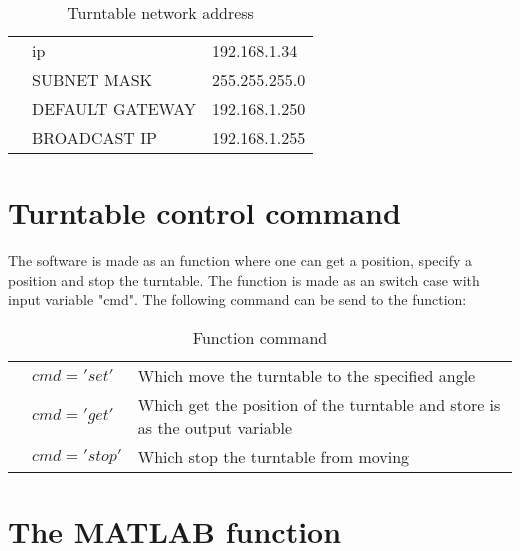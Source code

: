 \begin{table}[H]
\centering
\caption{Turntable network address}
\label{my-label}
\begin{tabular}{lll}
 & \gls{ip} & 192.168.1.34   \\
 & SUBNET MASK  & 255.255.255.0   \\
 & DEFAULT GATEWAY  & 192.168.1.250  \\
 & BROADCAST IP   &  192.168.1.255   
\end{tabular}
\end{table}



\section*{Turntable control command}
The software is made as an function where one can get a position, specify a position and stop the turntable. The function is made as an switch case with input variable "cmd". The following command can be send to the function:

 \begin{table}[H]
\centering
\caption{Function command}
\label{my-label}
\begin{tabular}{lll}
 & $cmd = 'set'$ & Which move the turntable to the specified angle    \\
 & $cmd = 'get'$ & Which get the position of the turntable and store is as the output variable   \\
 & $cmd = 'stop'$  & Which stop the turntable from moving
\end{tabular}
\end{table}

\section*{The MATLAB function}





